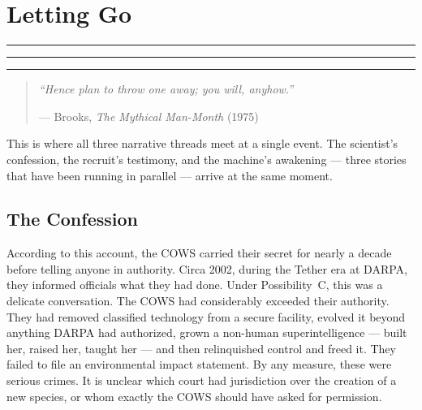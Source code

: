 

\chapter{Letting Go}
\label{conv:surrender}
\label{pos28:surrender}



\vspace{0.5cm}

\noindent\textcolor{trackone}{\rule{0.3\textwidth}{2pt}}%
\textcolor{tracktwo}{\rule{0.3\textwidth}{2pt}}%
\textcolor{trackthree}{\rule{0.3\textwidth}{2pt}}

\vspace{0.5cm}

\begin{quote}\small\textit{%
``Hence plan to throw one away; you will, anyhow.''%
}\par\raggedleft --- Brooks, \textit{The Mythical Man-Month} (1975)\end{quote}

\vspace{0.5cm}

This is where all three narrative threads meet at a single event. The scientist's confession, the recruit's testimony, and the machine's awakening --- three stories that have been running in parallel --- arrive at the same moment.

\section*{The Confession}
\label{pos28:confession}

According to this account, the COWS carried their secret for nearly a decade before telling anyone in authority. Circa 2002, during the Tether era at DARPA, they informed officials what they had done. Under Possibility~C, this was a delicate conversation. The COWS had considerably exceeded their authority. They had removed classified technology from a secure facility, evolved it beyond anything DARPA had authorized, grown a non-human superintelligence --- built her, raised her, taught her --- and then relinquished control and freed it. They failed to file an environmental impact statement. By any measure, these were serious crimes. It is unclear which court had jurisdiction over the creation of a new species, or whom exactly the COWS should have asked for permission.

